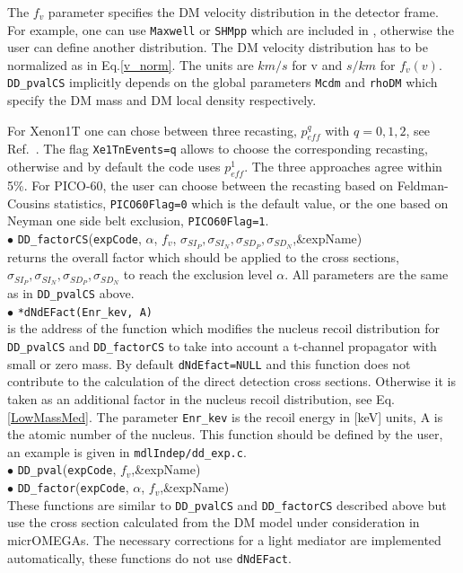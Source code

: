 \documentclass[12pt,a4paper]{article}
\begin{document}
The $f_v$ parameter specifies the DM velocity distribution in the detector frame. For
example, one can use   {\tt Maxwell} or {\tt SHMpp} which are
included in \micro, 
otherwise the user can define another distribution.   
The DM velocity distribution  has to be normalized  as in Eq.\ref{v_norm}.
 The units  are $km/s$ for v and $s/km$ for  $f_v(v)$. {\tt DD\_pvalCS} implicitly depends on the 
global parameters  {\tt Mcdm}  and  {\tt rhoDM} which specify the DM mass and DM  local density respectively.


For  Xenon1T one can chose  between  three recasting, $p_{eff}^{q}$ with $q=0,1,2$, 
see Ref.~\cite{Belanger:2020gnr}. The  flag {\tt Xe1TnEvents=q} allows to choose the  corresponding recasting,  otherwise and by default the code uses  $p_{eff}^1$. The three approaches agree  within 5\%. For PICO-60, the user can choose between the recasting based on Feldman-Cousins statistics, {\tt PICO60Flag=0} 
which is the default value, or the one based on  Neyman one side belt exclusion, {\tt PICO60Flag=1}.\\ 



\noindent
$\bullet$ \verb|DD_factorCS|(\verb|expCode|, $\alpha$, $f_v$, $\sigma_{SI_P},\sigma_{SI_N},\sigma_{SD_P},\sigma_{SD_N}$,\&expName)\\ 
returns the overall factor which should be applied to the cross sections, $\sigma_{SI_P},\sigma_{SI_N},\sigma_{SD_P}, \sigma_{SD_N}$ to reach  the exclusion level $\alpha$.  
All parameters are the same as in {\tt DD\_pvalCS} above. \\

\noindent
$\bullet$ \verb|*dNdEFact(Enr_kev, A)|\\
is the address of the function which modifies the nucleus recoil distribution  for {\tt DD\_pvalCS}
and {\tt DD\_factorCS}   to take into account a 
t-channel propagator  with  small or zero mass.  By default \verb|dNdEfact=NULL| and this 
function does not contribute to  the calculation of the direct detection cross sections. Otherwise  it is taken as an additional factor 
in the nucleus recoil distribution, see Eq.\ref{LowMassMed}.  
The parameter {\tt Enr\_kev} is the recoil energy in [keV] units, A is the  atomic number of the nucleus. This function should be defined by the user, an example is given in 
\verb|mdlIndep/dd_exp.c|.\\

\noindent
$\bullet$ \verb|DD_pval|(\verb|expCode|, $f_v$,\&expName)\\
$\bullet$  \verb|DD_factor|(\verb|expCode|, $\alpha$, $f_v$,\&expName)\\     
These functions are similar to  \verb|DD_pvalCS| and \verb|DD_factorCS| described above but use the  cross section calculated from the DM model under consideration in 
micrOMEGAs.  The necessary corrections for a light mediator are implemented automatically, these functions do not use {\tt dNdEFact}. \\
\end{document}
